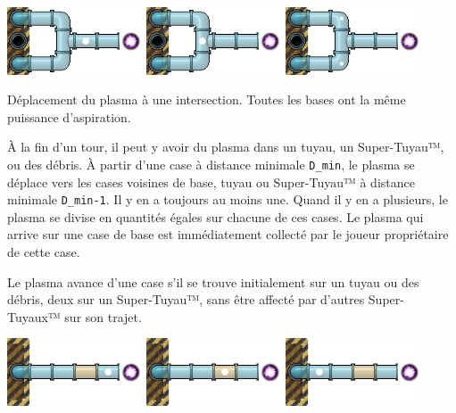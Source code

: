 \noindent\includegraphics[width=0.3\textwidth]{asset/split_t0.png}\hfill
\includegraphics[width=0.3\textwidth]{asset/split_t1.png}\hfill
\includegraphics[width=0.3\textwidth]{asset/split_t2.png}

Déplacement du plasma à une intersection. Toutes les bases ont la même
puissance d'aspiration.

À la fin d'un tour, il peut y avoir du plasma dans un tuyau, un
Super-Tuyau™, ou des débris. À partir d'une case à distance minimale
\texttt{D\_min}, le plasma se déplace vers les cases voisines de base,
tuyau ou Super-Tuyau™ à distance minimale \texttt{D\_min-1}. Il y en a
toujours au moins une. Quand il y en a plusieurs, le plasma se divise en
quantités égales sur chacune de ces cases. Le plasma qui arrive sur une
case de base est immédiatement collecté par le joueur propriétaire de
cette case.

Le plasma avance d'une case s'il se trouve initialement sur un tuyau ou
des débris, deux sur un Super-Tuyau™, sans être affecté par d'autres
Super-Tuyaux™ sur son trajet.

\noindent\includegraphics[width=0.3\textwidth]{asset/super_t0.png}\hfill
\includegraphics[width=0.3\textwidth]{asset/super_t1.png}\hfill
\includegraphics[width=0.3\textwidth]{asset/super_t2.png}

